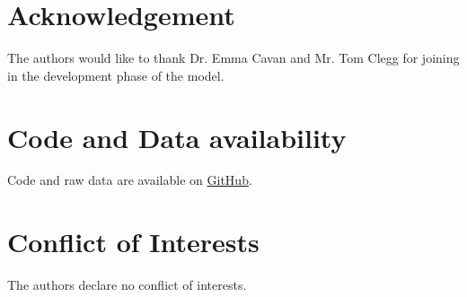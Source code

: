 \documentclass[env.tex]{subfiles}
\begin{document}
\section{Acknowledgement}
The authors would like to thank Dr. Emma Cavan and Mr. Tom Clegg for joining in the development phase of the model.

\section{Code and Data availability}
Code and raw data are available on \href{https://github.com/ph-u/Phytoplankton_Bacteria_Carbon_Capture_Model}{GitHub}.

\section{Conflict of Interests}
The authors declare no conflict of interests.
\end{document}
